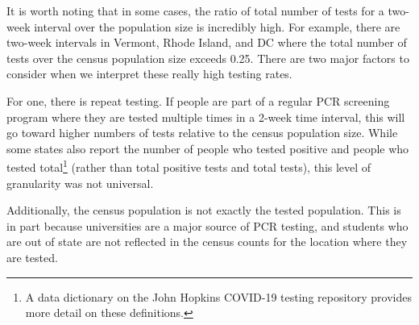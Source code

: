 \documentclass[12pt,twoside]{smiththesis}
\begin{document}
It is worth noting that in some cases, the ratio of total number of tests for a two-week interval over the population size is incredibly high. For example, there are two-week intervals in Vermont, Rhode Island, and DC where the total number of tests over the census population size exceeds 0.25. There are two major factors to consider when we interpret these really high testing rates.

For one, there is repeat testing. If people are part of a regular PCR screening program where they are tested multiple times in a 2-week time interval, this will go toward higher numbers of tests relative to the census population size. While some states also report the number of people who tested positive and people who tested total\footnote{A data dictionary on the John Hopkins COVID-19 testing repository provides more detail on these definitions.} (rather than total positive tests and total tests), this level of granularity was not universal.

Additionally, the census population is not exactly the tested population. This is in part because universities are a major source of PCR testing, and students who are out of state are not reflected in the census counts for the location where they are tested.
\end{document}
